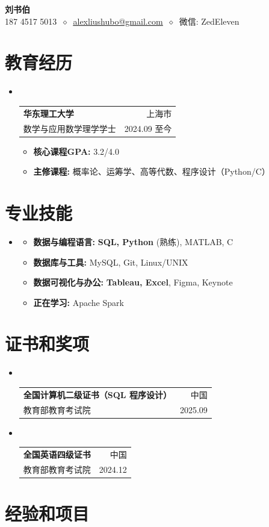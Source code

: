 \documentclass[a4paper, 12pt]{article}
\makeatletter
\newcommand{\cvitem}[1]{
  \item{
    {#1\vspace{-2pt}}
  }
}
\newcommand{\cvheading}[4]{
  \vspace{-7pt}\item\
    \begin{tabular*}{\textwidth}[t]{l@{\extracolsep{\fill}}r}
      \textbf{#1} & #2 \\
      \small #3 & \small#4 \\
    \end{tabular*}\vspace{-6pt}
}
\newcommand{\cvheadingstart}{\begin{itemize}[leftmargin=0in, label={}]}
\newcommand{\cvheadingend}{\end{itemize}}
\newcommand{\cvitemstart}{\begin{itemize}\justifying}
\newcommand{\cvitemend}{\end{itemize}\vspace{-12pt}}
\makeatother
\begin{document}
\begin{center}
  \textbf{\LARGE 刘书伯} \\
  \vspace{1.4pt}
  187 4517 5013
  $\ \diamond\ $ 
  \href{mailto:alexliushubo@gmail.com}{\underline{alexliushubo@gmail.com}} 
  $\ \diamond\ $
  微信: ZedEleven
\end{center}


\section{教育经历}
\cvheadingstart
  \cvheading
    {华东理工大学}{上海市}
    {数学与应用数学\hspace{5pt}理学学士}{2024.09 至今}
  \cvitemstart
    \cvitem{\textbf{核心课程GPA: }3.2/4.0}
    \cvitem{\textbf{主修课程: }概率论、运筹学、高等代数、程序设计（Python/C）}
  \cvitemend
\cvheadingend
\vspace{0pt}

\section{专业技能}
\cvheadingstart
\item
  \cvitemstart
  \cvitem{\textbf{数据与编程语言: } \textbf{SQL, Python} (熟练), MATLAB, C}
  \cvitem{\textbf{数据库与工具: } MySQL, Git, Linux/UNIX}
  \cvitem{\textbf{数据可视化与办公: } \textbf{Tableau, Excel}, Figma, Keynote}
  \cvitem{\textbf{正在学习: } Apache Spark}
  \cvitemend
\cvheadingend
\vspace{0pt}

\section{证书和奖项}
\cvheadingstart
	\cvheading
    {全国计算机二级证书（SQL 程序设计）}{中国}
    {教育部教育考试院}{2025.09}
	\vspace{-8pt}
  \cvheading
    {全国英语四级证书}{中国}
    {教育部教育考试院}{2024.12}

\cvheadingend


\section{经验和项目}
\end{document}
